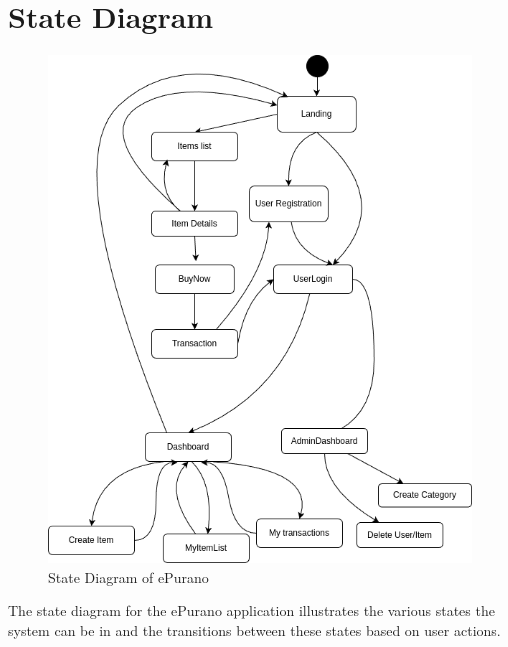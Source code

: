 \newpage
\section{State Diagram}

\begin{figure}[ht]
    \centering
    \includegraphics[scale=0.5]{../images/state.png}
    \caption{State Diagram of ePurano}%
    \label{fig:state_diagram}
\end{figure}
The state diagram for the ePurano application illustrates the various states the system can be in and the transitions between these states based on user actions. 

\newpage

